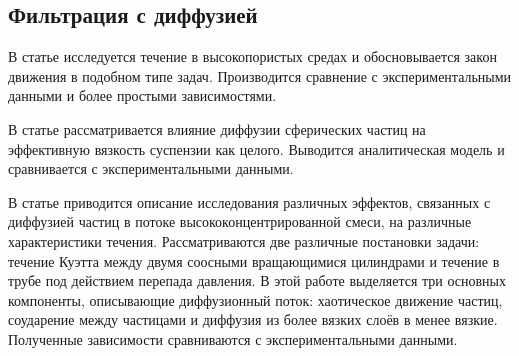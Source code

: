 \subsection{Фильтрация с диффузией}
\par В статье \cite{brinkman} исследуется течение в высокопористых средах и обосновывается закон движения в подобном типе задач. Производится сравнение с экспериментальными данными и более простыми зависимостями.
\par В статье \cite{leighton} рассматривается влияние диффузии сферических частиц на эффективную вязкость суспензии как целого. Выводится аналитическая модель и сравнивается с экспериментальными данными.
\par В статье \cite{phillips} приводится описание исследования различных эффектов, связанных с диффузией частиц в потоке высококонцентрированной смеси, на различные характеристики течения. Рассматриваются две различные постановки задачи: течение Куэтта между двумя соосными вращающимися цилиндрами и течение в трубе под действием перепада давления. В этой работе выделяется три основных компоненты, описывающие диффузионный поток: хаотическое движение частиц, соударение между частицами и диффузия из более вязких слоёв в менее вязкие. Полученные зависимости сравниваются с экспериментальными данными.
